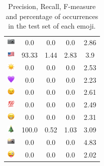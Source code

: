 \documentclass{article}
\begin{document}
\begin{table}
\begin{tabular}{|c|ccc|c|}
\includegraphics[height=0.37cm,width=0.37cm]{img/camera.png} & 0.0 & 0.0 & 0.0 & 2.86\\ 
\includegraphics[height=0.37cm,width=0.37cm]{img/United_States.png} & 93.33 & 1.44 & 2.83 & 3.9\\ 
\includegraphics[height=0.37cm,width=0.37cm]{img/sun.png} & 0.0 & 0.0 & 0.0 & 2.53\\ 
\includegraphics[height=0.37cm,width=0.37cm]{img/purple_heart.png} & 0.0 & 0.0 & 0.0 & 2.23\\ 
\includegraphics[height=0.37cm,width=0.37cm]{img/winking_face.png} & 0.0 & 0.0 & 0.0 & 2.61\\ 
\includegraphics[height=0.37cm,width=0.37cm]{img/hundred_points.png} & 0.0 & 0.0 & 0.0 & 2.49\\ 
\includegraphics[height=0.37cm,width=0.37cm]{img/beaming_face_with_smiling_eyes.png} & 0.0 & 0.0 & 0.0 & 2.31\\ 
\includegraphics[height=0.37cm,width=0.37cm]{img/Christmas_tree.png} & 100.0 & 0.52 & 1.03 & 3.09\\ 
\includegraphics[height=0.37cm,width=0.37cm]{img/camera_with_flash.png} & 0.0 & 0.0 & 0.0 & 4.83\\ 
\includegraphics[height=0.37cm,width=0.37cm]{img/winking_face_with_tongue.png} & 0.0 & 0.0 & 0.0 & 2.02\\ 

\hline
\end{tabular}
\caption{\label{table:emoji_detailed} Precision, Recall, F-measure and percentage of occurrences in the test set of each emoji.}
\end{table}
\end{document}
